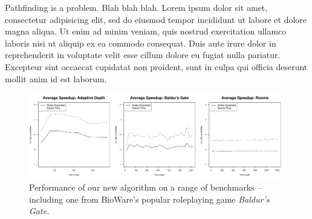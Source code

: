 Pathfinding is a problem. Blah blah blah.
Lorem ipsum dolor sit amet, consectetur adipisicing elit, sed do eiusmod
tempor incididunt ut labore et dolore magna aliqua. Ut enim ad minim
veniam, quis nostrud exercitation ullamco laboris nisi ut aliquip ex ea
commodo consequat. Duis aute irure dolor in reprehenderit in voluptate
velit esse cillum dolore eu fugiat nulla pariatur. Excepteur sint occaecat
cupidatat non proident, sunt in culpa qui officia deserunt mollit anim
id est laborum.

\begin{figure}[t]
\begin{center}
		\includegraphics[width=0.95\columnwidth, trim=10mm 0mm 10mm 0mm]{diagrams/speedup.pdf}
\caption{Performance of our new algorithm on a range of benchmarks -- including one from BioWare's popular roleplaying
game \emph{Baldur's Gate.}}
\end{center}
\end{figure}
